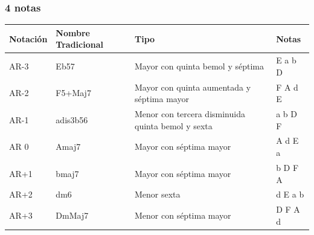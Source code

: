 \documentclass[]{report}
\begin{document}
\subsubsection*{4 notas}
\begin{table}[H]
	\centering
	\begin{tabularx}{\textwidth}{ll>{\raggedright\arraybackslash}Xl}
		\toprule
		Notación      & Nombre Tradicional & Tipo                                              & Notas   \\
		\midrule
		\textsf{AR-3} & Eb57               & Mayor con quinta bemol y séptima                  & E a b D \\
		\textsf{AR-2} & F5+Maj7            & Mayor con quinta aumentada y séptima mayor        & F A d E \\
		\textsf{AR-1} & adis3b56           & Menor con tercera disminuida quinta bemol y sexta & a b D F \\
		\textsf{AR 0} & Amaj7              & Mayor con séptima mayor                           & A d E a \\
		\textsf{AR+1} & bmaj7              & Mayor con séptima mayor                           & b D F A \\
		\textsf{AR+2} & dm6                & Menor sexta                                       & d E a b \\
		\textsf{AR+3} & DmMaj7             & Menor con séptima mayor                           & D F A d \\
		\bottomrule
	\end{tabularx}
\end{table}
\end{document}
